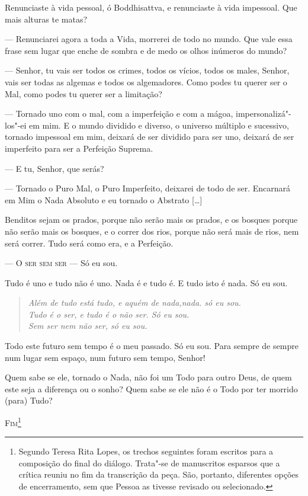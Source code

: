 Renunciaste à vida pessoal, ó Boddhisattva, e renunciaste à vida
impessoal. Que mais alturas te matas?

--- Renunciarei agora a toda a Vida, morrerei de todo no mundo. Que vale
essa frase sem lugar que enche de sombra e de medo os olhos inúmeros
do mundo?

--- Senhor, tu vais ser todos os crimes, todos os vícios, todos os
males, Senhor, vais ser todas as algemas e todos os algemadores. Como
podes tu querer ser o Mal, como podes tu querer ser a limitação?

--- Tornado uno com o mal, com a imperfeição e com a mágoa,
impersonalizá"-los"-ei em mim. E o mundo dividido e diverso, o universo
múltiplo e sucessivo, tornado impessoal em mim, deixará de ser
dividido para ser uno, deixará de ser imperfeito para ser a Perfeição
Suprema.

--- E tu, Senhor, que serás?

--- Tornado o Puro Mal, o Puro Imperfeito, deixarei de todo de ser.
Encarnará em Mim o Nada Absoluto e eu tornado o Abstrato [\ldots{}]

 Benditos sejam
os prados, porque não serão mais os prados, e os bosques porque não
serão mais os bosques, e o correr dos rios, porque não será mais de
rios, nem será correr. Tudo será como era, e a Perfeição.

--- \textsc{O ser sem ser} --- Só eu sou.

Tudo é uno e tudo não é uno. Nada é e tudo é. E tudo isto é nada. Só
eu sou.

\begin{verse}
{\itshape 
Além de tudo está tudo, e aquém de nada,\qb{}nada. só eu sou.\\ 
Tudo é o ser, e tudo é o não ser. Só eu sou.\\
Sem ser nem não ser, só eu sou.}
\end{verse}

 Todo este futuro sem tempo é o meu passado. Só eu sou. Para
sempre de sempre num lugar sem espaço, num futuro sem tempo, Senhor! %

 Quem sabe se ele, tornado o Nada, não foi um Todo para outro
Deus, de quem este seja a diferença ou o sonho? Quem sabe se ele não
é o Todo por ter morrido (para) Tudo?

\bigskip

\begin{center}
\textsc{Fim}\footnote{Segundo Teresa Rita Lopes, os trechos
seguintes foram escritos para a composição do final do diálogo.
Trata"-se de manuscritos esparsos que a crítica reuniu no fim da
transcrição da peça. São, portanto, diferentes opções de
encerramento, sem que Pessoa as tivesse revisado ou selecionado.}
\end{center}

